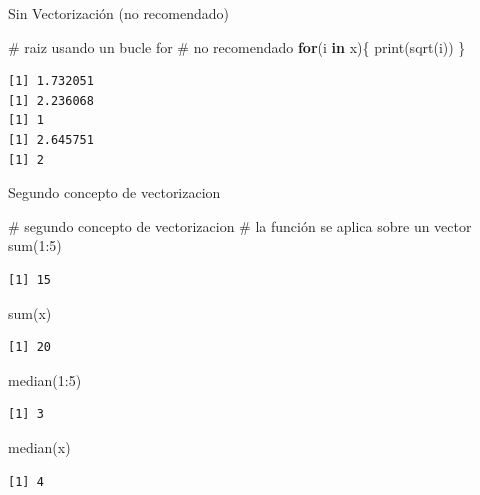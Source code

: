 \documentclass[
  ignorenonframetext,
  aspectratio=169,
  spanish,
]{beamer}
\newenvironment{Shaded}{\begin{snugshade}}{\end{snugshade}}
\newcommand{\CommentTok}[1]{\textcolor[rgb]{0.37,0.37,0.37}{#1}}
\newcommand{\ControlFlowTok}[1]{\textcolor[rgb]{0.00,0.23,0.31}{\textbf{#1}}}
\newcommand{\DecValTok}[1]{\textcolor[rgb]{0.68,0.00,0.00}{#1}}
\newcommand{\FunctionTok}[1]{\textcolor[rgb]{0.28,0.35,0.67}{#1}}
\newcommand{\NormalTok}[1]{\textcolor[rgb]{0.00,0.23,0.31}{#1}}
\newcommand{\SpecialCharTok}[1]{\textcolor[rgb]{0.37,0.37,0.37}{#1}}
\begin{document}
\begin{frame}[fragile]{Sin Vectorización (no recomendado)}
\label{sin-vectorizaciuxf3n-no-recomendado}
\begin{Shaded}
\begin{Highlighting}[]
\CommentTok{\# raiz usando un bucle for }
\CommentTok{\# no recomendado}
\ControlFlowTok{for}\NormalTok{(i }\ControlFlowTok{in}\NormalTok{ x)\{}
\FunctionTok{print}\NormalTok{(}\FunctionTok{sqrt}\NormalTok{(i))}
\NormalTok{\}}
\end{Highlighting}
\end{Shaded}

\begin{verbatim}
[1] 1.732051
[1] 2.236068
[1] 1
[1] 2.645751
[1] 2
\end{verbatim}
\end{frame}

\begin{frame}[fragile]{Segundo concepto de vectorizacion}
\label{segundo-concepto-de-vectorizacion}
\begin{Shaded}
\begin{Highlighting}[]
\CommentTok{\# segundo concepto de vectorizacion }
\CommentTok{\# la función se aplica sobre un vector}
\FunctionTok{sum}\NormalTok{(}\DecValTok{1}\SpecialCharTok{:}\DecValTok{5}\NormalTok{)  }
\end{Highlighting}
\end{Shaded}

\begin{verbatim}
[1] 15
\end{verbatim}

\begin{Shaded}
\begin{Highlighting}[]
\FunctionTok{sum}\NormalTok{(x)}
\end{Highlighting}
\end{Shaded}

\begin{verbatim}
[1] 20
\end{verbatim}

\begin{Shaded}
\begin{Highlighting}[]
\FunctionTok{median}\NormalTok{(}\DecValTok{1}\SpecialCharTok{:}\DecValTok{5}\NormalTok{) }
\end{Highlighting}
\end{Shaded}

\begin{verbatim}
[1] 3
\end{verbatim}

\begin{Shaded}
\begin{Highlighting}[]
\FunctionTok{median}\NormalTok{(x)}
\end{Highlighting}
\end{Shaded}

\begin{verbatim}
[1] 4
\end{verbatim}
\end{frame}
\end{document}
